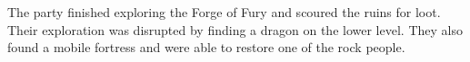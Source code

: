 The party finished exploring the Forge of Fury and scoured the ruins for loot.
Their exploration was disrupted by finding a dragon on the lower level.
They also found a mobile fortress and were able to restore one of the rock people.
